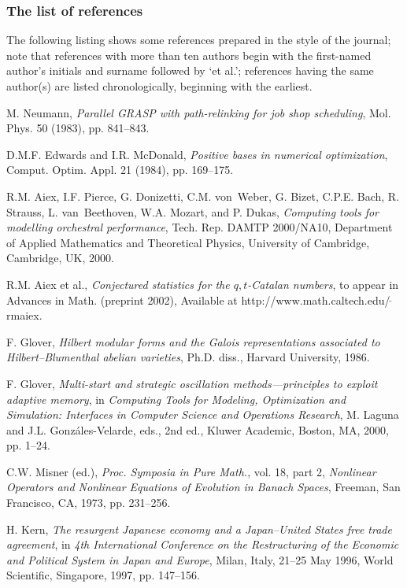 \documentclass[]{tMAM2e}
\begin{document}
\subsubsection{The list of references} The following listing shows some references prepared in the style of the
journal; note that references with more than ten authors begin with the first-named author's initials and
surname followed by `et al.'; references having the same author(s) are listed chronologically, beginning with the earliest.
%
%
\begin{thebibliography}{10}
M. Neumann, {\em Parallel GRASP with path-relinking for job shop scheduling}, Mol. Phys. 50 (1983), pp. 841--843.

D.M.F. Edwards and I.R. McDonald, {\em Positive bases in numerical optimization}, Comput. Optim. Appl. 21 (1984),
pp. 169--175.

R.M. Aiex, I.F. Pierce, G. Donizetti, C.M. {{v}on~Weber}, G. Bizet, C.P.E. Bach, R. Strauss, L. {{v}an~Beethoven}, W.A. Mozart, and P. Dukas, {\em Computing tools for modelling orchestral performance}, Tech.
Rep. DAMTP 2000/NA10, Department of Applied Mathematics and Theoretical Physics, University of Cambridge,
Cambridge, UK, 2000.

R.M. Aiex et al.,  {\em Conjectured statistics for the {$q,t$}-Catalan numbers}, to appear in Advances in Math. (preprint 2002), Available at http://www.math.caltech.edu/$_{\huge{\tilde{}}}$rmaiex.

F. Glover,  {\em Hilbert modular forms and the Galois representations associated to Hilbert--Blumenthal abelian varieties}, Ph.D. diss., Harvard University, 1986.

F. Glover, {\it{Multi-start and strategic oscillation methods---principles to exploit adaptive memory}}, in {\it Computing Tools for Modeling, Optimization and Simulation: Interfaces in Computer Science and Operations Research}, M. Laguna and J.L. Gonz\'{a}les-Velarde, eds., 2nd ed., Kluwer Academic, Boston, MA, 2000, pp. 1--24.


C.W. Misner (ed.), {\it{Proc. Symposia in Pure Math.}}, vol. 18, part 2, {\it{Nonlinear Operators and Nonlinear Equations of Evolution in Banach Spaces}}, Freeman, San \nobreak Francisco, CA, 1973, pp. 231--256.

H. Kern, {\em{The resurgent Japanese economy and a Japan--United States free trade agreement}}, in {\em{4th International Conference on the Restructuring of the Economic and Political System
in Japan and Europe}}, Milan, Italy, 21--25 May 1996, World Scientific, Singapore, 1997, pp. 147--156.


\end{thebibliography}
\end{document}
